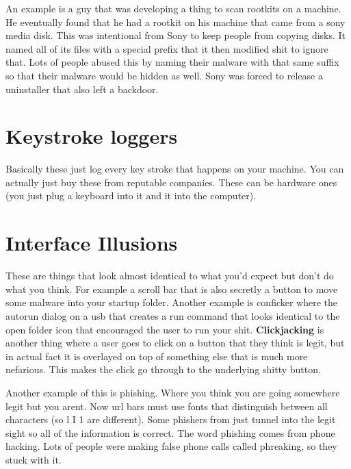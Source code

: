 \documentclass{article}
\begin{document}
An example is a guy that was developing a thing to scan rootkits on a machine. He eventually found that he had a rootkit on his machine that came from a sony media disk. This was intentional from Sony to keep people from copying disks. It named all of its files with a special prefix that it then modified shit to ignore that. Lots of people abused this by naming their malware with that same suffix so that their malware would be hidden as well. Sony was forced to release a uninstaller that also left a backdoor. 


\section{Keystroke loggers} %
\label{sec:keystroke_loggers}
Basically these just log every key stroke that happens on your machine. You can actually just buy these from reputable companies. These can be hardware ones (you just plug a keyboard into it and it into the computer).


\section{Interface Illusions} %
\label{sec:interface_illusions}
These are things that look almost identical to what you'd expect but don't do what you think. For example a scroll bar that is also secretly a button to move some malware into your startup folder. Another example is conficker where the autorun dialog on a usb that creates a run command that looks identical to the open folder icon that encouraged the user to run your shit. \textbf{Clickjacking} is another thing where a user goes to click on a button that they think is legit, but in actual fact it is overlayed on top of something else that is much more nefarious. This makes the click go through to the underlying shitty button. 

Another example of this is phishing. Where you think you are going somewhere legit but you arent. Now url bars must use fonts that distinguish between all characters (so l I 1 are different). Some phishers from just tunnel into the legit sight so all of the information is correct. The word phishing comes from phone hacking. Lots of people were making false phone calls called phreaking, so they stuck with it.


\end{document}
